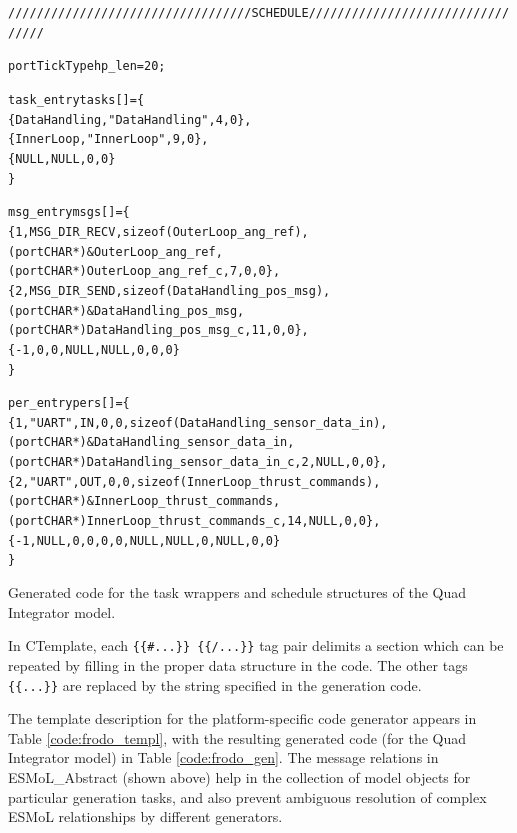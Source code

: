 \begin{table}
\centering
\begin{alltt}
\scriptsize
////////////////////////////////// SCHEDULE /////////////////////////////////

portTickType hp_len = 20;

task\_entry tasks[] = \{
   \{ DataHandling, "DataHandling", 4, 0\},
   \{ InnerLoop, "InnerLoop", 9, 0\},
   \{NULL, NULL, 0, 0\}
\}\;

msg\_entry msgs[] = \{
   \{ 1, MSG\_DIR\_RECV, sizeof( OuterLoop\_ang\_ref ), 
      (portCHAR *) \& OuterLoop\_ang\_ref, 
      (portCHAR *) OuterLoop_ang\_ref\_c, 7, 0, 0\},
   \{ 2, MSG\_DIR\_SEND, sizeof( DataHandling\_pos\_msg ), 
      (portCHAR *) \& DataHandling\_pos\_msg, 
      (portCHAR *) DataHandling\_pos\_msg\_c, 11, 0, 0\},
   \{ -1, 0, 0, NULL, NULL, 0, 0, 0\}
\}\;

per\_entry pers[] = \{
   \{ 1, "UART", IN, 0, 0, sizeof( DataHandling\_sensor\_data\_in ), 
      (portCHAR *) \& DataHandling\_sensor\_data\_in, 
      (portCHAR *) DataHandling\_sensor\_data\_in\_c, 2, NULL, 0, 0\},
   \{ 2, "UART", OUT, 0, 0, sizeof( InnerLoop\_thrust\_commands ), 
      (portCHAR *) \& InnerLoop\_thrust\_commands, 
      (portCHAR *) InnerLoop\_thrust\_commands\_c, 14, NULL, 0, 0\},
   \{ -1, NULL, 0, 0, 0, 0, NULL, NULL, 0, NULL, 0, 0 \}
\}\;

\end{alltt}
\caption{Generated code for the task wrappers and schedule structures of the Quad Integrator model.}
\label{code:frodo_gen}
\end{table}

In CTemplate, each \verb${{#...}} {{/...}}$ tag pair delimits a section which
can be repeated by filling in the proper data structure in the code.  The other
tags \verb${{...}}$ are replaced by the string specified in the generation
code. 

The template description for the platform-specific code generator appears in Table \ref{code:frodo_templ},
with the resulting generated code (for the Quad Integrator model) in Table \ref{code:frodo_gen}.
The message relations in ESMoL\_Abstract (shown above) help in the collection of model objects for 
particular generation tasks, and also prevent ambiguous resolution of complex ESMoL relationships by
different generators.


